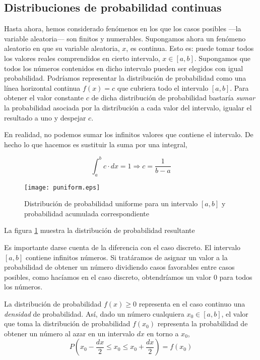 \subsection{Distribuciones de probabilidad continuas}\label{pdfc}
Hasta ahora, hemos considerado fenómenos en los que los casos posibles ---la variable aleatoria--- son finitos y numerables. Supongamos ahora un fenómeno aleatorio en que su variable aleatoria, $x$, es continua. Esto es: puede tomar todos los valores reales comprendidos en cierto intervalo, $x \in [a,b]$. Supongamos que todos los números contenidos en dicho intervalo pueden ser elegidos con igual probabilidad. Podríamos representar la distribución de probabilidad como una línea horizontal continua $f(x) = c$ que cubriera todo el intervalo $[a,b]$. Para obtener el valor constante $c$ de dicha distribución de probabilidad bastaría \emph{sumar} la probabilidad asociada por la distribución a cada valor del intervalo, igualar el resultado a uno y despejar $c$.

En realidad, no podemos sumar los infinitos valores que contiene el intervalo. De hecho lo que hacemos es sustituir la suma por una integral,

\begin{equation*}
\int_a^b c\cdot dx = 1 \Rightarrow c = \frac{1}{b-a}
\end{equation*}
\begin{figure}
\centering
\texttt{[image: puniform.eps]}
\caption{Distribución de probabilidad uniforme para un intervalo $[a,b]$ y probabilidad acumulada correspondiente}
\label{fig:puniform}
\end{figure}

La figura \ref{fig:puniform} muestra la distribución de probabilidad resultante

Es importante darse cuenta de la diferencia con el caso discreto. El intervalo $[a,b]$ contiene infinitos números. Si tratáramos de asignar un valor a la probabilidad de obtener un número dividiendo casos favorables entre casos posibles, como hacíamos en el caso discreto, obtendríamos un valor $0$ para todos los números. 

La distribución de probabilidad $f(x)\geqslant 0$ representa en el caso continuo una \emph{densidad} de probabilidad. Así, dado un número cualquiera $x_0 \in [a,b]$, el valor que toma la distribución de probabilidad $f(x_0)$ representa la probabilidad de obtener un número al azar en un intervalo $dx$ en torno a $x_0$,
\begin{equation*}
P\left(x_0-\frac{dx}{2}\leqslant x_0 \leqslant x_0+\frac{dx}{2}\right) = f(x_0)
\end{equation*} 

